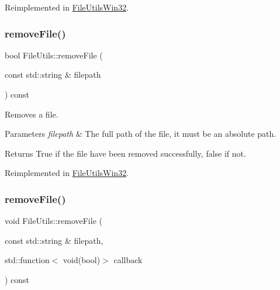 Reimplemented in \hyperlink{classFileUtilsWin32_aab51310dbc155b73cb9f3d4f3a918d36}{File\+Utils\+Win32}.

\mbox{\label{classFileUtils_aa9131b62319c343316a68d45cbe1d6b1}} 
\subsubsection{\texorpdfstring{remove\+File()}{removeFile()}\hspace{0.1cm}{\footnotesize\ttfamily [2/3]}}
{\footnotesize\ttfamily bool File\+Utils\+::remove\+File (\begin{DoxyParamCaption}\item[{const std\+::string \&}]{filepath }\end{DoxyParamCaption}) const\hspace{0.3cm}{\ttfamily [virtual]}}

Removes a file.


\begin{DoxyParams}{Parameters}
{\em filepath} & The full path of the file, it must be an absolute path. \\
\hline
\end{DoxyParams}
\begin{DoxyReturn}{Returns}
True if the file have been removed successfully, false if not. 
\end{DoxyReturn}


Reimplemented in \hyperlink{classFileUtilsWin32_a45bb3aa3aff99f5d4367d048f722beaa}{File\+Utils\+Win32}.

\mbox{\label{classFileUtils_a9f5c6583d4c07bdb9903a0129d34ec17}} 
\subsubsection{\texorpdfstring{remove\+File()}{removeFile()}\hspace{0.1cm}{\footnotesize\ttfamily [3/3]}}
{\footnotesize\ttfamily void File\+Utils\+::remove\+File (\begin{DoxyParamCaption}\item[{const std\+::string \&}]{filepath,  }\item[{std\+::function$<$ void(bool)$>$}]{callback }\end{DoxyParamCaption}) const\hspace{0.3cm}{\ttfamily [virtual]}}


